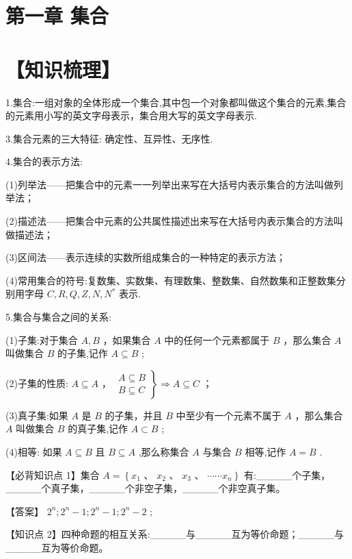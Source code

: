 \documentclass[10pt]{article}
\begin{document}
\section*{第一章 集合}

\section*{【知识梳理】}

1.集合:一组对象的全体形成一个集合,其中包一个对象都叫做这个集合的元素,集合的元素用小写的英文字母表示，集合用大写的英文字母表示.

3.集合元素的三大特征: 确定性、互异性、无序性.

4.集合的表示方法:

(1)列举法——把集合中的元素一一列举出来写在大括号内表示集合的方法叫做列举法；

(2)描述法——把集合中元素的公共属性描述出来写在大括号内表示集合的方法叫做描述法；

(3)区间法——表示连续的实数所组成集合的一种特定的表示方法；

(4)常用集合的符号:复数集、实数集、有理数集、整数集、自然数集和正整数集分别用字母 \(C,R,Q,Z,N,{N}^{ * }\) 表示.

5.集合与集合之间的关系:

(1)子集:对于集合 \(A,B\) ，如果集合 \(A\) 中的任何一个元素都属于 \(B\) ，那么集合 \(A\) 叫做集合 \(B\) 的子集,记作 \(A \subseteq  B\) ;

(2)子集的性质: \(A \subseteq  A\) ， \(\left. \begin{array}{l} A \subseteq  B \\  B \subseteq  C \end{array}\right\}   \Rightarrow  A \subseteq  C\) ；

(3)真子集:如果 \(A\) 是 \(B\) 的子集，并且 \(B\) 中至少有一个元素不属于 \(A\) ，那么集合 \(A\) 叫做集合 \(B\) 的真子集,记作 \(A \subset  B\) ;

(4)相等: 如果 \(A \subseteq  B\) 且 \(B \subseteq  A\) ,那么称集合 \(A\) 与集合 \(B\) 相等,记作 \(A = B\) .

【必背知识点 1】集合 \(A = \left\{  {{x}_{1}\text{ 、 }{x}_{2}\text{ 、 }{x}_{3}\text{ 、 }\cdots \cdots {x}_{n}}\right\}\) 有:\_\_\_\_\_个子集，\_\_\_\_\_个真子集，\_\_\_\_\_个非空子集，\_\_\_\_\_个非空真子集。

【答案】 \({2}^{n};{2}^{n} - 1;{2}^{n} - 1;{2}^{n} - 2\) ;

【知识点 2】四种命题的相互关系:\_\_\_\_\_与\_\_\_\_\_互为等价命题；\_\_\_\_\_与\_\_\_\_\_互为等价命题。
\end{document}
